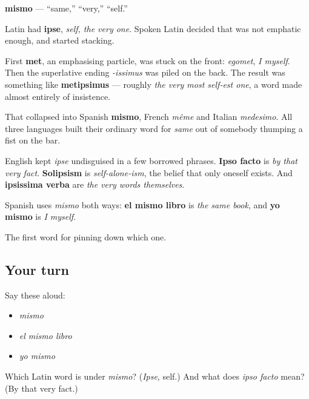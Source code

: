 \begin{cousinweb}
\textbf{mismo} — \textquotedblleft{}same,\textquotedblright{} \textquotedblleft{}very,\textquotedblright{} \textquotedblleft{}self.\textquotedblright{}

Latin had \textbf{ipse}, \emph{self, the very one}. Spoken Latin decided that was not emphatic enough, and started stacking.

First \textbf{met}, an emphasising particle, was stuck on the front: \emph{egomet}, \emph{I myself}. Then the superlative ending \emph{-issimus} was piled on the back. The result was something like \textbf{metipsimus} — roughly \emph{the very most self-est one}, a word made almost entirely of insistence.

That collapsed into Spanish \textbf{mismo}, French \emph{même} and Italian \emph{medesimo}. All three languages built their ordinary word for \emph{same} out of somebody thumping a fist on the bar.

English kept \emph{ipse} undisguised in a few borrowed phrases. \textbf{Ipso facto} is \emph{by that very fact}. \textbf{Solipsism} is \emph{self-alone-ism}, the belief that only oneself exists. And \textbf{ipsissima verba} are \emph{the very words themselves}.

Spanish uses \emph{mismo} both ways: \textbf{el mismo libro} is \emph{the same book}, and \textbf{yo mismo} is \emph{I myself}.
\end{cousinweb}

\begin{grammarlens}[title={What you've built}]
The first word for pinning down which one.
\end{grammarlens}

\subsection*{Your turn}
Say these aloud:

\begin{itemize}
\raggedright
  \item \emph{mismo}
  \item \emph{el mismo libro}
  \item \emph{yo mismo}
\end{itemize}

\begin{tcolorbox}[breakable,colback=teal!4,colframe=teal!35!black,title={Before you move on}]
Which Latin word is under \emph{mismo}? (\emph{Ipse}, self.) And what does \emph{ipso facto} mean? (By that very fact.)
\end{tcolorbox}
